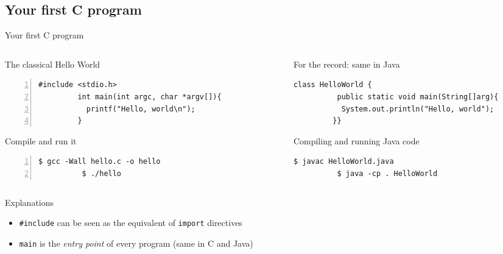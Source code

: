 \subsection{Your first C program}
\begin{frame}[fragile]{Your first C program}

  \begin{columns}
    \begin{column}{.47\linewidth}
      \begin{block}{The classical Hello World}\medskip
       \begin{Verbatim}[gobble=9,frame=single,fontsize=\small,label=hello.c,numbers=left]
         #include <stdio.h>
         int main(int argc, char *argv[]){
           printf("Hello, world\n");
         }
       \end{Verbatim}
      \end{block}  

      \begin{block}{Compile and run it}
        \begin{Verbatim}[gobble=9,fontsize=\small,frame=single,numbers=left]
          $ gcc -Wall hello.c -o hello
          $ ./hello
        \end{Verbatim}
      \end{block}
    \end{column}

    \begin{column}{.53\linewidth}
      \begin{block}{For the record: same in Java}\medskip
       \begin{Verbatim}[gobble=9,fontsize=\small,frame=single,label=hello.c]
         class HelloWorld {
          public static void main(String[]arg){
           System.out.println("Hello, world");
         }}
       \end{Verbatim}        
      \end{block}
      \begin{block}{Compiling and running Java code}
        \begin{Verbatim}[gobble=9,fontsize=\small,frame=single]
          $ javac HelloWorld.java
          $ java -cp . HelloWorld
        \end{Verbatim}
      \end{block}
    \end{column}
  \end{columns}
  \begin{block}{Explanations}
    \begin{itemize}
    \item \texttt{\#include} can be seen as the equivalent of \texttt{import}
      directives
    \item \texttt{main} is the \textit{entry point} of every program (same in C
      and Java)
    \end{itemize}
  \end{block}
\end{frame}
